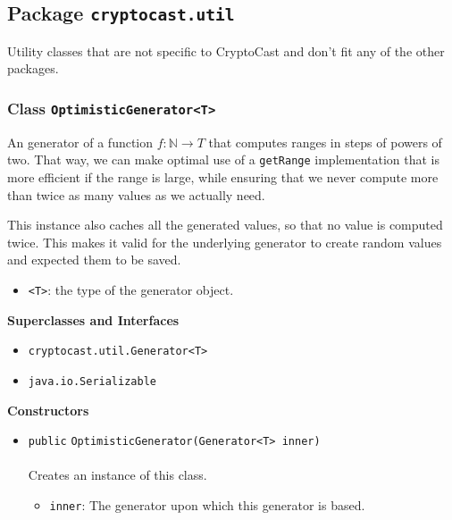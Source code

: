 \subsection{Package \lstinline!cryptocast.util!}
Utility classes that are not specific to CryptoCast and don't fit any of the other packages.

\subsubsection{Class \lstinline|OptimisticGenerator<T>|}
An generator of a function $f: \mathbb{N} \to T$ that computes ranges in
 steps of powers of two. That way, we can make optimal use of a \lstinline|getRange|
 implementation that is more efficient if the range is large, while ensuring
 that we never compute more than twice as many values as we actually need.

 This instance also caches all the generated values, so that no value is
 computed twice. This makes it valid for the underlying generator to create
 random values and expected them to be saved. \\
\noindent\begin{minipage}[t]{5cm}
\vspace{0.3em}
\hspace*{2em}
\vspace{0.3em}
\end{minipage}

\begin{itemize}
\item \lstinline|<T>|: the type of the generator object.
\end{itemize}


\textbf{\sffamily Superclasses and Interfaces}
\begin{itemize}
\item \lstinline|cryptocast.util.Generator<T>|
\item \lstinline|java.io.Serializable|
\end{itemize}


\textbf{\sffamily Constructors}
\begin{itemize}
\item \lstinline|public| \lstinline|OptimisticGenerator|\lstinline|(Generator<T> inner)|\\ \\[-0.6em]
Creates an instance of this class.
\begin{itemize}
\item \lstinline|inner|: The generator upon which this generator is based.
\end{itemize}



\end{itemize}


